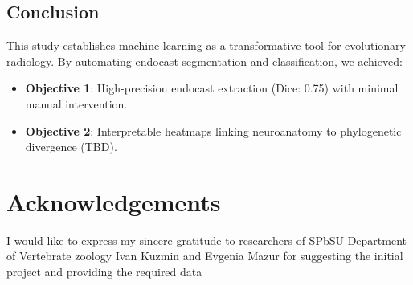 \section{Conclusion}
This study establishes machine learning as a transformative tool for evolutionary radiology. By automating endocast segmentation and classification, we achieved:
\begin{itemize}
    \item \textbf{Objective 1}: High-precision endocast extraction (Dice: 0.75) with minimal manual intervention.
    \item \textbf{Objective 2}: Interpretable heatmaps linking neuroanatomy to phylogenetic divergence (TBD).
\end{itemize}
\newpage
\chapter*{Acknowledgements}
I would like to express my sincere gratitude to researchers of SPbSU Department of Vertebrate zoology Ivan Kuzmin and Evgenia Mazur for suggesting the initial project and providing the required data